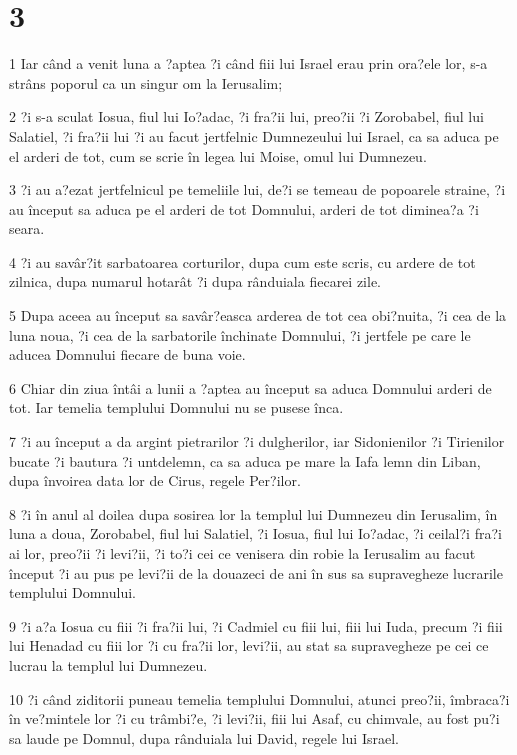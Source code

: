 \chapter{3}

\par 1 Iar când a venit luna a ?aptea ?i când fiii lui Israel erau prin ora?ele lor, s-a strâns poporul ca un singur om la Ierusalim;
\par 2 ?i s-a sculat Iosua, fiul lui Io?adac, ?i fra?ii lui, preo?ii ?i Zorobabel, fiul lui Salatiel, ?i fra?ii lui ?i au facut jertfelnic Dumnezeului lui Israel, ca sa aduca pe el arderi de tot, cum se scrie în legea lui Moise, omul lui Dumnezeu.
\par 3 ?i au a?ezat jertfelnicul pe temeliile lui, de?i se temeau de popoarele straine, ?i au început sa aduca pe el arderi de tot Domnului, arderi de tot diminea?a ?i seara.
\par 4 ?i au savâr?it sarbatoarea corturilor, dupa cum este scris, cu ardere de tot zilnica, dupa numarul hotarât ?i dupa rânduiala fiecarei zile.
\par 5 Dupa aceea au început sa savâr?easca arderea de tot cea obi?nuita, ?i cea de la luna noua, ?i cea de la sarbatorile închinate Domnului, ?i jertfele pe care le aducea Domnului fiecare de buna voie.
\par 6 Chiar din ziua întâi a lunii a ?aptea au început sa aduca Domnului arderi de tot. Iar temelia templului Domnului nu se pusese înca.
\par 7 ?i au început a da argint pietrarilor ?i dulgherilor, iar Sidonienilor ?i Tirienilor bucate ?i bautura ?i untdelemn, ca sa aduca pe mare la Iafa lemn din Liban, dupa învoirea data lor de Cirus, regele Per?ilor.
\par 8 ?i în anul al doilea dupa sosirea lor la templul lui Dumnezeu din Ierusalim, în luna a doua, Zorobabel, fiul lui Salatiel, ?i Iosua, fiul lui Io?adac, ?i ceilal?i fra?i ai lor, preo?ii ?i levi?ii, ?i to?i cei ce venisera din robie la Ierusalim au facut început ?i au pus pe levi?ii de la douazeci de ani în sus sa supravegheze lucrarile templului Domnului.
\par 9 ?i a?a Iosua cu fiii ?i fra?ii lui, ?i Cadmiel cu fiii lui, fiii lui Iuda, precum ?i fiii lui Henadad cu fiii lor ?i cu fra?ii lor, levi?ii, au stat sa supravegheze pe cei ce lucrau la templul lui Dumnezeu.
\par 10 ?i când ziditorii puneau temelia templului Domnului, atunci preo?ii, îmbraca?i în ve?mintele lor ?i cu trâmbi?e, ?i levi?ii, fiii lui Asaf, cu chimvale, au fost pu?i sa laude pe Domnul, dupa rânduiala lui David, regele lui Israel.
